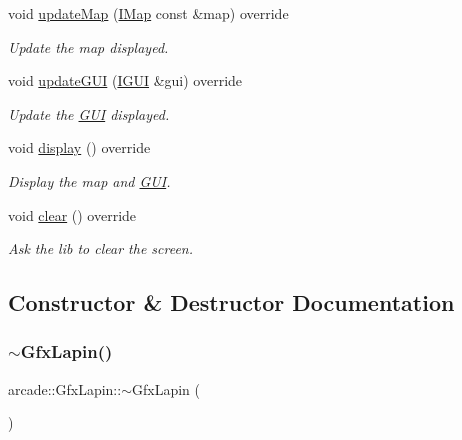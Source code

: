 \begin{DoxyCompactItemize}
$$void \hyperlink{classarcade_1_1_gfx_lapin_a06f4eb48bd1ea7749d81870211115a46}{update\+Map} (\hyperlink{classarcade_1_1_i_map}{I\+Map} const \&map) override
\begin{DoxyCompactList}\small\item\em Update the map displayed. \end{DoxyCompactList}\item 
void \hyperlink{classarcade_1_1_gfx_lapin_a6b226d0278ba5d43e956eb28557124ef}{update\+G\+UI} (\hyperlink{classarcade_1_1_i_g_u_i}{I\+G\+UI} \&gui) override
\begin{DoxyCompactList}\small\item\em Update the \hyperlink{classarcade_1_1_g_u_i}{G\+UI} displayed. \end{DoxyCompactList}\item 
void \hyperlink{classarcade_1_1_gfx_lapin_ac7c96886eb54a7d2f18e528e8f0c7ba1}{display} () override
\begin{DoxyCompactList}\small\item\em Display the map and \hyperlink{classarcade_1_1_g_u_i}{G\+UI}. \end{DoxyCompactList}\item 
void \hyperlink{classarcade_1_1_gfx_lapin_a42dd719cbf1cd88c3abf70d16f02fd92}{clear} () override
\begin{DoxyCompactList}\small\item\em Ask the lib to clear the screen. \end{DoxyCompactList}\end{DoxyCompactItemize}


\subsection{Constructor \& Destructor Documentation}
\mbox{\label{classarcade_1_1_gfx_lapin_a87275ed29f549db04dc3888ace3fc73e}} 
\subsubsection{\texorpdfstring{$\sim$\+Gfx\+Lapin()}{~GfxLapin()}}
{\footnotesize\ttfamily arcade\+::\+Gfx\+Lapin\+::$\sim$\+Gfx\+Lapin (\begin{DoxyParamCaption}{ }\end{DoxyParamCaption})\hspace{0.3cm}{\ttfamily [virtual]}}

